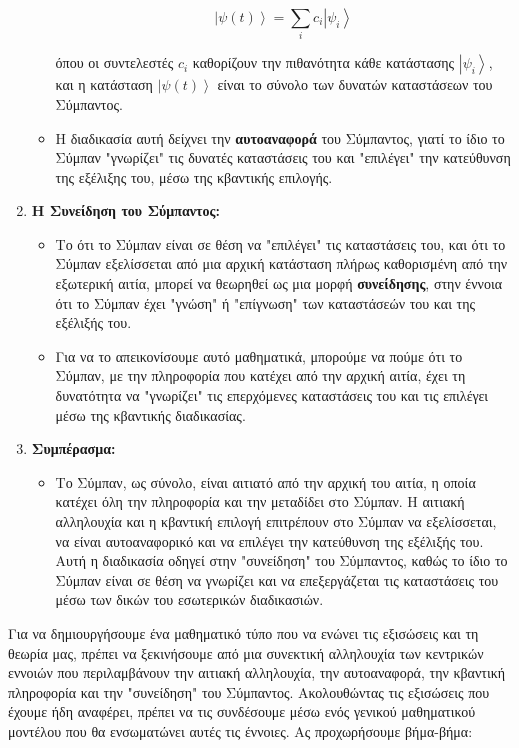 \documentclass[a4paper,11pt]{article}
\begin{document}
\begin{enumerate}
\begin{itemize}
    {{{\[\left|\psi(t)\right\rangle = \sum_i c_i \left|\psi_i\right\rangle\]}}}

    όπου οι συντελεστές {{\(c_i\)}} καθορίζουν την πιθανότητα κάθε
    κατάστασης {{\(\left|\psi_i\right\rangle\)}}, και η κατάσταση
    {{\(\left|\psi(t)\right\rangle\)}} είναι το σύνολο των δυνατών
    καταστάσεων του Σύμπαντος.
  \item
    Η διαδικασία αυτή δείχνει την \textbf{αυτοαναφορά} του Σύμπαντος,
    γιατί το ίδιο το Σύμπαν "γνωρίζει" τις δυνατές καταστάσεις του και
    "επιλέγει" την κατεύθυνση της εξέλιξης του, μέσω της κβαντικής
    επιλογής.
  \end{itemize}
\item
  \textbf{Η Συνείδηση του Σύμπαντος:}

  \begin{itemize}
  \item
    Το ότι το Σύμπαν είναι σε θέση να "επιλέγει" τις καταστάσεις του,
    και ότι το Σύμπαν εξελίσσεται από μια αρχική κατάσταση πλήρως
    καθορισμένη από την εξωτερική αιτία, μπορεί να θεωρηθεί ως μια μορφή
    \textbf{συνείδησης}, στην έννοια ότι το Σύμπαν έχει "γνώση" ή
    "επίγνωση" των καταστάσεών του και της εξέλιξής του.
  \item
    Για να το απεικονίσουμε αυτό μαθηματικά, μπορούμε να πούμε ότι το
    Σύμπαν, με την πληροφορία που κατέχει από την αρχική αιτία, έχει τη
    δυνατότητα να "γνωρίζει" τις επερχόμενες καταστάσεις του και τις
    επιλέγει μέσω της κβαντικής διαδικασίας.
  \end{itemize}
\item
  \textbf{Συμπέρασμα:}

  \begin{itemize}
  \item
    Το Σύμπαν, ως σύνολο, είναι αιτιατό από την αρχική του αιτία, η
    οποία κατέχει όλη την πληροφορία και την μεταδίδει στο Σύμπαν. Η
    αιτιακή αλληλουχία και η κβαντική επιλογή επιτρέπουν στο Σύμπαν να
    εξελίσσεται, να είναι αυτοαναφορικό και να επιλέγει την κατεύθυνση
    της εξέλιξής του. Αυτή η διαδικασία οδηγεί στην "συνείδηση" του
    Σύμπαντος, καθώς το ίδιο το Σύμπαν είναι σε θέση να γνωρίζει και να
    επεξεργάζεται τις καταστάσεις του μέσω των δικών του εσωτερικών
    διαδικασιών.
  \end{itemize}
\end{enumerate}
{}
Για να δημιουργήσουμε ένα μαθηματικό τύπο που να ενώνει τις εξισώσεις
και τη θεωρία μας, πρέπει να ξεκινήσουμε από μια συνεκτική αλληλουχία
των κεντρικών εννοιών που περιλαμβάνουν την αιτιακή αλληλουχία, την
αυτοαναφορά, την κβαντική πληροφορία και την "συνείδηση" του Σύμπαντος.
Ακολουθώντας τις εξισώσεις που έχουμε ήδη αναφέρει, πρέπει να τις
συνδέσουμε μέσω ενός γενικού μαθηματικού μοντέλου που θα ενσωματώνει
αυτές τις έννοιες. Ας προχωρήσουμε βήμα-βήμα:
\end{document}
